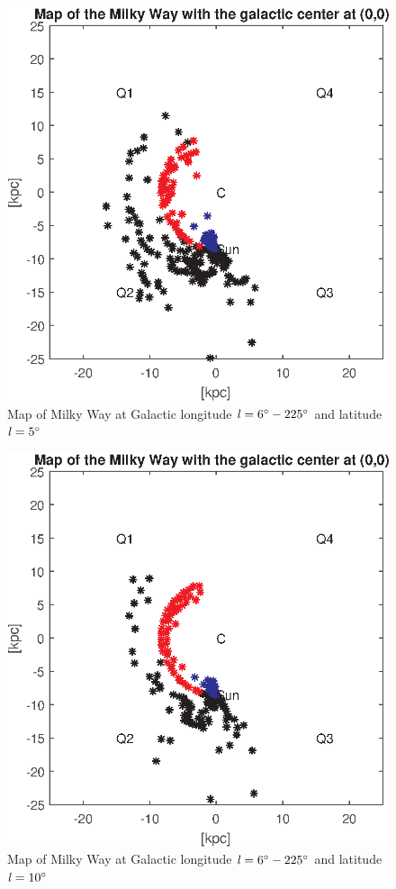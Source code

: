 \documentclass[fleqn,usenatbib]{mnras}
\begin{document}
\begin{figure}
      \includegraphics[width=\columnwidth]{Map_2}
      \caption{Map of Milky Way at Galactic longitude $\mathit{l}=6\hbox{$^\circ$}-225\hbox{$^\circ$}$ and latitude $\mathit{l}=5\hbox{$^\circ$}$}
      \label{fig:map-2}
\end{figure}

\begin{figure}
      \includegraphics[width=\columnwidth]{Map_3}
      \caption{Map of Milky Way at Galactic longitude $\mathit{l}=6\hbox{$^\circ$}-225\hbox{$^\circ$}$ and latitude $\mathit{l}=10\hbox{$^\circ$}$}
      \label{fig:map-3}
\end{figure}
\end{document}
